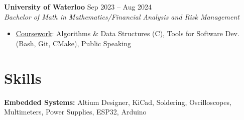 \documentclass[10pt,letterpaper]{article}
\begin{document}

\raggedright
\textbf{University of Waterloo} \hfill
Sep 2023 -- Aug 2024 \\
\textit{Bachelor of Math in Mathematics/Financial Analysis and Risk Management} \hfill
\begin{itemize}
    \item \underline{Coursework}: 
    Algorithms \& Data Structures (C), 
    Tools for Software Dev. (Bash, Git, CMake), 
    Public Speaking
\end{itemize}













\section{Skills}

\hspace{0.75em}\textbf{Embedded Systems:} 
    Altium Designer, KiCad, Soldering, Oscilloscopes, Multimeters, Power Supplies, 
    ESP32, Arduino \\
\end{document}
